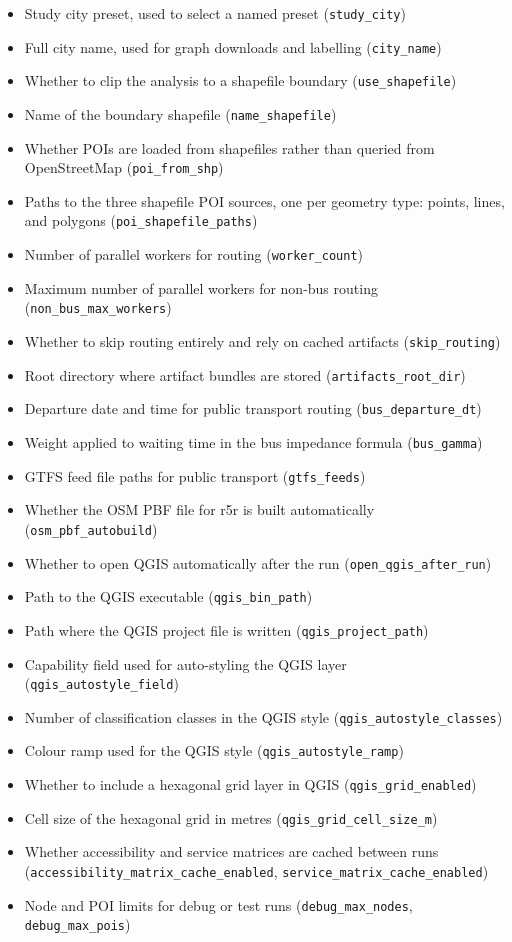 \documentclass[11pt]{article}
\begin{document}
\begin{itemize}
  \item Study city preset, used to select a named preset (\texttt{study\_city})
  \item Full city name, used for graph downloads and labelling (\texttt{city\_name})
  \item Whether to clip the analysis to a shapefile boundary (\texttt{use\_shapefile})
  \item Name of the boundary shapefile (\texttt{name\_shapefile})
  \item Whether POIs are loaded from shapefiles rather than queried from OpenStreetMap (\texttt{poi\_from\_shp})
  \item Paths to the three shapefile POI sources, one per geometry type: points, lines, and polygons (\texttt{poi\_shapefile\_paths})
  \item Number of parallel workers for routing (\texttt{worker\_count})
  \item Maximum number of parallel workers for non-bus routing (\texttt{non\_bus\_max\_workers})
  \item Whether to skip routing entirely and rely on cached artifacts (\texttt{skip\_routing})
  \item Root directory where artifact bundles are stored (\texttt{artifacts\_root\_dir})
  \item Departure date and time for public transport routing (\texttt{bus\_departure\_dt})
  \item Weight applied to waiting time in the bus impedance formula (\texttt{bus\_gamma})
  \item GTFS feed file paths for public transport (\texttt{gtfs\_feeds})
  \item Whether the OSM PBF file for r5r is built automatically (\texttt{osm\_pbf\_autobuild})
  \item Whether to open QGIS automatically after the run (\texttt{open\_qgis\_after\_run})
  \item Path to the QGIS executable (\texttt{qgis\_bin\_path})
  \item Path where the QGIS project file is written (\texttt{qgis\_project\_path})
  \item Capability field used for auto-styling the QGIS layer (\texttt{qgis\_autostyle\_field})
  \item Number of classification classes in the QGIS style (\texttt{qgis\_autostyle\_classes})
  \item Colour ramp used for the QGIS style (\texttt{qgis\_autostyle\_ramp})
  \item Whether to include a hexagonal grid layer in QGIS (\texttt{qgis\_grid\_enabled})
  \item Cell size of the hexagonal grid in metres (\texttt{qgis\_grid\_cell\_size\_m})
  \item Whether accessibility and service matrices are cached between runs (\texttt{accessibility\_matrix\_cache\_enabled}, \texttt{service\_matrix\_cache\_enabled})
  \item Node and POI limits for debug or test runs (\texttt{debug\_max\_nodes}, \texttt{debug\_max\_pois})
\end{itemize}
\end{document}
